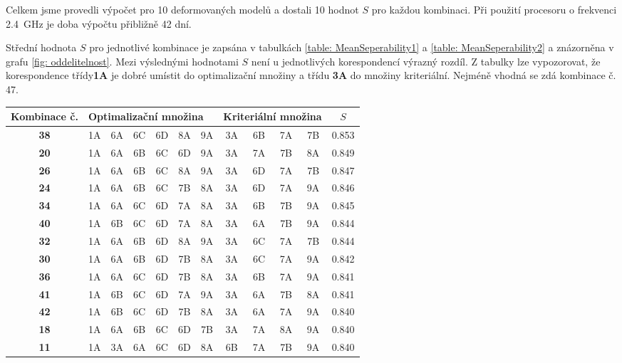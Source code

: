 	Celkem jsme provedli výpočet pro 10 deformovaných modelů a dostali 10 hodnot $S$ pro každou kombinaci. Při použití procesoru o frekvenci \SI{2.4}{\giga\Hz} je doba výpočtu přibližně 42 dní. 
	
	Střední hodnota $S$ pro jednotlivé kombinace je zapsána v tabulkách \ref{table: MeanSeperability1} a \ref{table: MeanSeperability2} a znázorněna v grafu \ref{fig: oddelitelnost}. Mezi výslednými hodnotami $S$ není u jednotlivých korespondencí výrazný rozdíl. Z tabulky lze vypozorovat, že korespondence třídy\textbf{1A} je dobré umístit do optimalizační množiny a třídu \textbf{3A} do množiny kriteriální. Nejméně vhodná se zdá kombinace č. 47.  
	
\begin{table}
\centering
\begin{tabular}{|c||c|c|c|c|c|c||c|c|c|c||c|}
\hline
Kombinace č. &  \multicolumn{6}{l||}{Optimalizační množina} & \multicolumn{4}{l||}{Kriteriální množina} & $S$ \\
\hline \hline 
\textbf{38} & 1A & 6A & 6C & 6D & 8A & 9A & 3A & 6B & 7A & 7B & 0.853 \\
\hline
\textbf{20} & 1A & 6A & 6B & 6C & 6D & 9A & 3A & 7A & 7B & 8A & 0.849 \\
\hline
\textbf{26} & 1A & 6A & 6B & 6C & 8A & 9A & 3A & 6D & 7A & 7B & 0.847 \\
\hline
\textbf{24} & 1A & 6A & 6B & 6C & 7B & 8A & 3A & 6D & 7A & 9A & 0.846 \\
\hline
\textbf{34} & 1A & 6A & 6C & 6D & 7A & 8A & 3A & 6B & 7B & 9A & 0.845 \\
\hline
\textbf{40} & 1A & 6B & 6C & 6D & 7A & 8A & 3A & 6A & 7B & 9A & 0.844 \\
\hline
\textbf{32} & 1A & 6A & 6B & 6D & 8A & 9A & 3A & 6C & 7A & 7B & 0.844 \\
\hline
\textbf{30} & 1A & 6A & 6B & 6D & 7B & 8A & 3A & 6C & 7A & 9A & 0.842 \\
\hline
\textbf{36} & 1A & 6A & 6C & 6D & 7B & 8A & 3A & 6B & 7A & 9A & 0.841 \\
\hline
\textbf{41} & 1A & 6B & 6C & 6D & 7A & 9A & 3A & 6A & 7B & 8A & 0.841 \\
\hline
\textbf{42} & 1A & 6B & 6C & 6D & 7B & 8A & 3A & 6A & 7A & 9A & 0.840 \\
\hline
\textbf{18} & 1A & 6A & 6B & 6C & 6D & 7B & 3A & 7A & 8A & 9A & 0.840 \\
\hline
\textbf{11} & 1A & 3A & 6A & 6C & 6D & 8A & 6B & 7A & 7B & 9A & 0.840 \\

\end{tabular}
\end{table}
